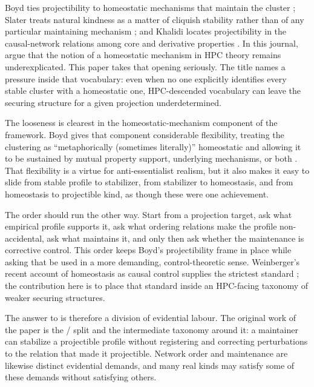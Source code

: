 \documentclass[12pt]{article}
\begin{document}
Boyd ties projectibility to homeostatic mechanisms that maintain the cluster
\citep{boyd1991}; Slater treats natural kindness as a matter of cliquish
stability rather than of any particular maintaining mechanism \citep{slater2015};
and Khalidi locates projectibility in the
causal-network relations among core and derivative properties
\citep{khalidi2013,khalidi2018nodes}. In this journal, \textcite{onishi2022}
argue that the notion of a homeostatic mechanism in HPC theory remains
underexplicated. This paper takes that opening seriously. The title names
a pressure inside that vocabulary: even when no one explicitly identifies every
stable cluster with a homeostatic one, HPC-descended vocabulary can leave the
securing structure for a given projection underdetermined.

The looseness is clearest in the homeostatic-mechanism component of the framework.
Boyd gives that component considerable flexibility, treating the clustering as
\enquote{metaphorically (sometimes literally)} homeostatic and allowing it to be
sustained by mutual property support, underlying mechanisms, or both
\citep{boyd1999}. That flexibility is a virtue for anti-essentialist realism, but
it also makes it easy to slide from stable profile to stabilizer, from stabilizer
to homeostasis, and from homeostasis to projectible kind, as though these were one
achievement.

The order should run the other way. Start from a projection target, ask what
empirical profile supports it, ask what ordering relations make the profile
non-accidental, ask what maintains it, and only then ask whether the maintenance
is corrective control. This order keeps Boyd's projectibility frame in place
while asking that  be used in a more demanding,
control-theoretic sense. Weinberger's recent account of homeostasis as causal
control supplies the strictest standard
\citep{weinberger2026HomeostasisCausalControl}; the contribution here is to
place that standard inside an HPC-facing taxonomy of weaker securing structures.

The answer to \textcite{onishi2022} is therefore a division of evidential labour.
The original work of the paper is the / split
and the intermediate taxonomy around it: a maintainer can stabilize a projectible
profile without registering and correcting perturbations to the relation that made
it projectible. Network order and maintenance are likewise distinct evidential
demands, and many real kinds may satisfy some of these demands without satisfying
others.
\end{document}
